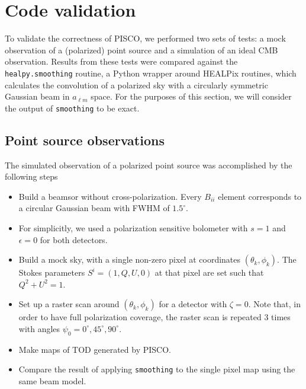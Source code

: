 \documentclass[a4paper,11pt]{article}
\begin{document}
%
\section{Code validation}
\label{sec::validation}

To validate the correctness of PISCO, we performed two sets of tests: a mock observation of a (polarized) point source and a simulation of an ideal CMB observation. Results from these tests were compared against the \texttt{healpy.smoothing} routine, a Python wrapper around HEALPix routines, which calculates the convolution of a polarized sky with a circularly symmetric Gaussian beam in $a_{\ell m}$ space. For the purposes of this section, we will consider the output of \texttt{smoothing} to be exact. 

\subsection{Point source observations}

The simulated observation of a polarized point source was accomplished by the following steps

\begin{itemize}
    \item Build a beamsor without cross-polarization. Every $B_{ii}$ element corresponds to a circular Gaussian beam with FWHM of $1.5^\circ$. 
    \item For simplicitly, we used a polarization sensitive bolometer with $s=1$ and $\epsilon=0$ for both detectors.
	\item Build a mock sky, with a single non-zero pixel at coordinates $(\theta_k,\phi_k)$. The Stokes parameters $S^{i} = (1,Q,U,0)$ at that pixel are set such that $Q^2 + U^2 = 1$.
	\item Set up a raster scan around $(\theta_k,\phi_k)$ for a detector with $\zeta=0$. Note that, in order to have full polarization coverage, the raster scan is repeated 3 times with angles $\psi_0 = 0^{\circ},45^{\circ},90^{\circ}$.
	\item Make maps of TOD generated by PISCO.
	\item Compare the result of applying \texttt{smoothing} to the single pixel map using the same beam model.
\end{itemize}
\end{document}
